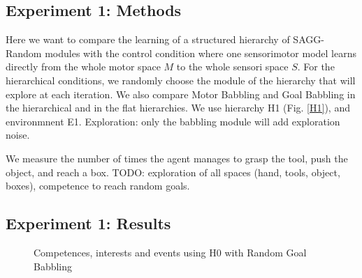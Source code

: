 \documentclass[conference]{include/IEEEtran}
\begin{document}
	
	\subsection{Experiment 1: Methods}		
				
		Here we want to compare the learning of a structured hierarchy of SAGG-Random modules with the control condition where one sensorimotor model learns
		directly from the whole motor space $M$ to the whole sensori space $S$. 
		For the hierarchical conditions, we randomly choose the module of the hierarchy that will explore at each iteration.
		We also compare Motor Babbling and Goal Babbling in the hierarchical and in the flat hierarchies.
		We use hierarchy H1 (Fig. \ref{H1}), and environmnent E1.
		Exploration: only the babbling module will add exploration noise.
			
		We measure the number of times the agent manages to grasp the tool, push the object, and reach a box.
		TODO: exploration of all spaces (hand, tools, object, boxes), competence to reach random goals.
		
			
	\subsection{Experiment 1: Results}
	
		\begin{figure}[!t]
			\centering
			\caption{Competences, interests and events using H0 with Random Goal Babbling}
			\label{resH0GB}
		\end{figure}
		
\end{document}
